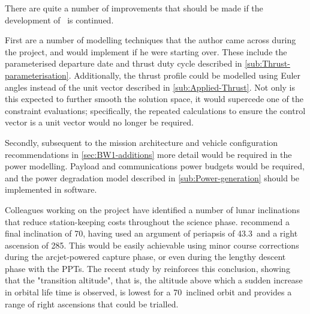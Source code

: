 There are quite a number of improvements that should be made if the development of \BW\ is continued. 

First are a number of modelling techniques that the author came across during the project, and would implement if he were starting over. These include the parameterised departure date and thrust duty cycle described in \autoref{sub:Thrust-parameterisation}. Additionally, the thrust profile could be modelled using Euler angles instead of the unit vector described in \autoref{sub:Applied-Thrust}. Not only is this expected to further smooth the solution space, it would supercede one of the constraint evaluations; specifically, the repeated calculations to ensure the control vector is  a unit vector would no longer be required.

Secondly, subsequent to the mission architecture and vehicle configuration recommendations in \autoref{sec:BW1-additions} more detail would be required in the power modelling. Payload and communications power budgets would be required, and the power degradation model described in \autoref{sub:Power-generation} should be implemented in software.


Colleagues working on the project have identified a number of lunar inclinations that reduce station-keeping costs throughout the science phase. \textcite{Zeile2010} recommend a final inclination of 70\degrees, having used an argument of periapsis of 43.3\degrees\ and a right ascension of 285\degrees. This would be easily achievable using minor course corrections during the arcjet-powered capture phase, or even during the lengthy descent phase with the PPTs. The recent study by \textcite[Figure 14a]{Gupta2011} reinforces this conclusion, showing that the "transition altitude", that is, the altitude above which a sudden increase in orbital life time is observed, is lowest for a 70\degrees\ inclined orbit and provides a range of right ascensions that could be trialled.

